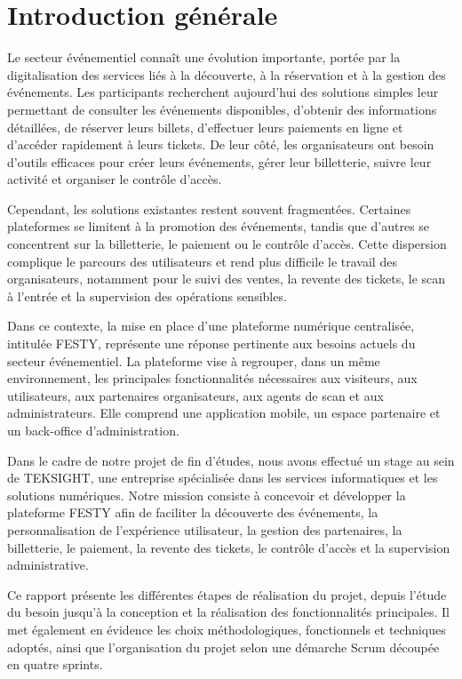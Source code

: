 \chapter*{Introduction générale}
\label{chap:introduction}

Le secteur événementiel connaît une évolution importante, portée par la digitalisation des services liés à la découverte, à la réservation et à la gestion des événements. Les participants recherchent aujourd’hui des solutions simples leur permettant de consulter les événements disponibles, d’obtenir des informations détaillées, de réserver leurs billets, d’effectuer leurs paiements en ligne et d’accéder rapidement à leurs tickets. De leur côté, les organisateurs ont besoin d’outils efficaces pour créer leurs événements, gérer leur billetterie, suivre leur activité et organiser le contrôle d’accès.

Cependant, les solutions existantes restent souvent fragmentées. Certaines plateformes se limitent à la promotion des événements, tandis que d’autres se concentrent sur la billetterie, le paiement ou le contrôle d’accès. Cette dispersion complique le parcours des utilisateurs et rend plus difficile le travail des organisateurs, notamment pour le suivi des ventes, la revente des tickets, le scan à l’entrée et la supervision des opérations sensibles.

Dans ce contexte, la mise en place d’une plateforme numérique centralisée, intitulée FESTY, représente une réponse pertinente aux besoins actuels du secteur événementiel. La plateforme vise à regrouper, dans un même environnement, les principales fonctionnalités nécessaires aux visiteurs, aux utilisateurs, aux partenaires organisateurs, aux agents de scan et aux administrateurs. Elle comprend une application mobile, un espace partenaire et un back-office d’administration.

Dans le cadre de notre projet de fin d’études, nous avons effectué un stage au sein de TEKSIGHT, une entreprise spécialisée dans les services informatiques et les solutions numériques. Notre mission consiste à concevoir et développer la plateforme FESTY afin de faciliter la découverte des événements, la personnalisation de l’expérience utilisateur, la gestion des partenaires, la billetterie, le paiement, la revente des tickets, le contrôle d’accès et la supervision administrative.

Ce rapport présente les différentes étapes de réalisation du projet, depuis l’étude du besoin jusqu’à la conception et la réalisation des fonctionnalités principales. Il met également en évidence les choix méthodologiques, fonctionnels et techniques adoptés, ainsi que l’organisation du projet selon une démarche Scrum découpée en quatre sprints.

